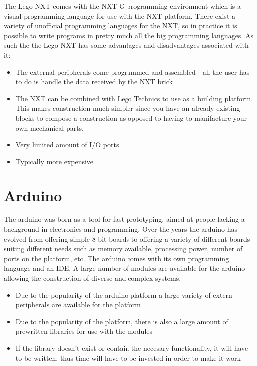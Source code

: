 The Lego NXT comes with the NXT-G programming environment which is a visual
programming language for use with the NXT platform. There exist a
variety of unofficial programming languages for the NXT, so in practice it is
possible to write programs in pretty much all the big programming
languages\Source. As such the the Lego NXT has some advantages and disadvantages
associated with it\Source:
\begin{itemize}
  \item The external peripherals come programmed and assembled - all the user
  has to do is handle the data received by the NXT brick
  \item The NXT can be combined with Lego Technics to use as a building
  platform. This makes construction much simpler since you have an already
  existing blocks to compose a construction as opposed to having to manifacture
  your own mechanical parts.
  \item Very limited amount of I/O ports
  \item Typically more expensive
\end{itemize}

\section{Arduino}
The arduino was born as a tool for fast prototyping, aimed at people lacking a
background in electronics and programming. Over the years the arduino has
evolved from offering simple 8-bit boards to offering a variety of different
boards suiting different needs such as memory available, processing power,
number of ports on the platform, etc. The arduino comes with its own
programming language and an IDE. A large number of modules are available for
the arduino allowing the construction of diverse and complex systems.\Source

\begin{itemize}
	\item Due to the popularity of the arduino platform a large variety of extern
	peripherals are available for the platform
	\item Due to the popularity of the platform, there is also a large amount of
	prewritten libraries for use with the modules
	\item If the library doesn't exist or contain the necesary functionality, it
	will have to be written, thus time will have to be invested in order to make
	it work
\end{itemize}

